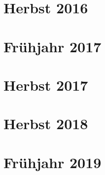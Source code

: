 \documentclass{lehramt-informatik-examen-sammlung}
\begin{document}
\section{Herbst 2016}


\section{Frühjahr 2017}


\section{Herbst 2017}


\section{Herbst 2018}


\section{Frühjahr 2019}

\end{document}
